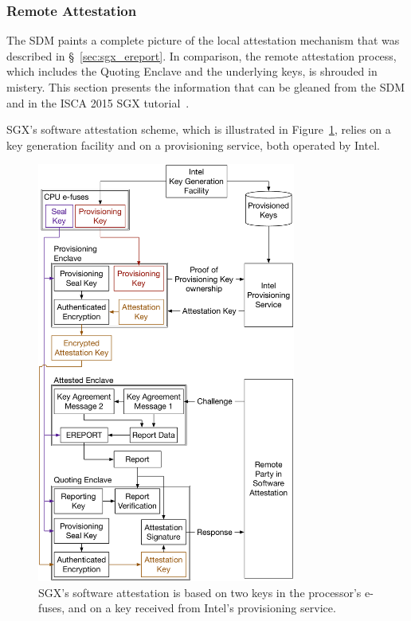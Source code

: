 \subsubsection{Remote Attestation}
\label{sec:sgx_quoting_enclave}

The SDM paints a complete picture of the local attestation mechanism that was
described in \S~\ref{sec:sgx_ereport}. In comparison, the remote attestation
process, which includes the Quoting Enclave and the underlying keys, is
shrouded in mistery. This section presents the information that can be gleaned
from the SDM and in the ISCA 2015 SGX tutorial~\cite{intel2015iscasgx}.


SGX's software attestation scheme, which is illustrated in
Figure~\ref{fig:sgx_attestation_keys}, relies on a key generation facility and
on a provisioning service, both operated by Intel.

\begin{figure}[hbt]
  \centering
  \includegraphics[width=85mm]{figures/sgx_attestation_keys.pdf}
  \caption{
    SGX's software attestation is based on two keys in the processor's e-fuses,
    and on a key received from Intel's provisioning service.
  }
  \label{fig:sgx_attestation_keys}
\end{figure}

